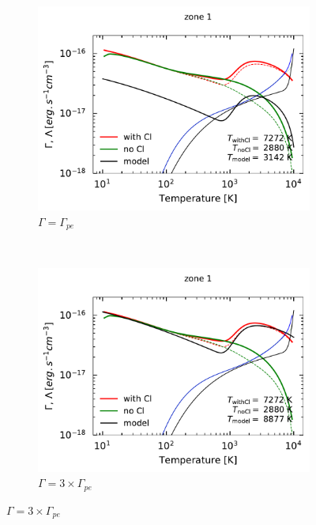 \begin{figure}[!h]
    \centering
    \begin{subfigure}[t]{0.49\textwidth} %
        \centering \includegraphics[trim = {0 0 0 1cm },clip,width=1\textwidth]{figure/Cl/modelPE/GCcomp_Cl_1_1.pdf}
        \caption{$\Gamma =  \Gamma_{pe}$}
    \label{fig:Cl:modelPE:GC}
    \end{subfigure}
    ~ 
    \begin{subfigure}[t]{0.49\textwidth}
        \centering \includegraphics[trim = {0 0 0 1cm },clip,width=1\textwidth]{figure/Cl/modelPE/GCcomp_Cl_1_3.pdf}
        \caption{$\Gamma =  3 \times \Gamma_{pe}$}
    \label{fig:Cl:modelPE:GC3}
    \end{subfigure}

\end{figure}
